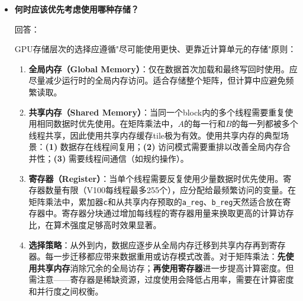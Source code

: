 \documentclass{SYSUReport}
\begin{document}
\begin{itemize}
\begin{itemize}
    \item \textbf{按行划分}：实现相对简单（1D grid），对$A$矩阵访问合并性好（每行连续存储），但当$M$较小时并行度不足。适合$M \gg N$的瘦高矩阵乘法场景。
    \item \textbf{按列划分}：同样实现简单（1D grid），但由于矩阵在内存中按行优先存储，访问$B$矩阵的一列意味着跨步读取（stride = $N$），导致非合并访存，严重降低性能。除非配合矩阵转置等预处理，否则不建议使用。
    \item \textbf{按数据块划分}：实现略微复杂（需要2D grid和更精细的索引计算），但提供了最佳的并行度（$O(N^2/\text{tile\_size}^2)$个线程块）、最好的访存合并性（两个矩阵的tile访问都连续），以及最高的共享内存利用率。是通用矩阵乘法的标准实现方式，也是cuBLAS等库的底层策略。
\end{itemize}

    \item \textbf{何时应该优先考虑使用哪种存储？}\par
    回答：

GPU存储层次的选择应遵循"尽可能使用更快、更靠近计算单元的存储"原则：

\begin{enumerate}
    \item \textbf{全局内存（Global Memory）}：仅在数据首次加载和最终写回时使用。应尽量减少运行时的全局内存访问。适合存储整个矩阵，但计算中应避免频繁读取。

    \item \textbf{共享内存（Shared Memory）}：当同一个block内的多个线程需要重复使用相同数据时优先使用。在矩阵乘法中，$A$的每一行和$B$的每一列都被多个线程共享，因此使用共享内存缓存tile极为有效。使用共享内存的典型场景：\textbf{(1)} 数据存在线程间复用；\textbf{(2)} 访问模式需要重排以改善全局内存合并性；\textbf{(3)} 需要线程间通信（如规约操作）。

    \item \textbf{寄存器（Register）}：当单个线程需要反复使用少量数据时优先使用。寄存器数量有限（V100每线程最多255个），应分配给最频繁访问的变量。在矩阵乘法中，累加器\texttt{c}和从共享内存预取的\texttt{a\_reg}、\texttt{b\_reg}天然适合放在寄存器中。寄存器分块通过增加每线程的寄存器用量来换取更高的计算访存比，在算术强度足够高时效果显著。

    \item \textbf{选择策略}：从外到内，数据应逐步从全局内存迁移到共享内存再到寄存器。每一步迁移都应带来数据重用或访存模式改善。对于矩阵乘法：\textbf{先使用共享内存}消除冗余的全局访存；\textbf{再使用寄存器}进一步提高计算密度。但需注意——寄存器是稀缺资源，过度使用会降低占用率，需要在计算密度和并行度之间权衡。
\end{enumerate}

\end{itemize}
\end{document}
